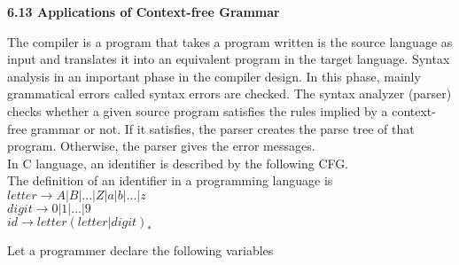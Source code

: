\documentclass[a4,9pt]{beamer}
\begin{document}
\begin{frame}
\large{
\textbf{6.13 Applications of Context-free Grammar}\\
}

\vspace*{0.2cm}
\small{
The compiler is a program that takes a program written is the source language as input and translates it
into an equivalent program in the target language. Syntax analysis in an important phase in the compiler
design. In this phase, mainly grammatical errors called syntax errors are checked. The syntax analyzer
(parser) checks whether a given source program satisfies the rules implied by a context-free grammar
or not. If it satisfies, the parser creates the parse tree of that program. Otherwise, the parser gives the
error messages.\\
\hspace*{0.5cm} In C language, an identifier is described by the following CFG.\\
\hspace*{0.5cm} The definition of an identifier in a programming language is\\

\vspace*{0.2cm}
\hspace*{4cm} $letter \rightarrow A | B | . . . | Z | a | b | ... | z$ \\
\hspace*{4cm} $digit \rightarrow 0 | 1 | . . . | 9$ \\
\hspace*{4.5cm} $id \rightarrow letter (letter | digit)_{*}$ \\
\vspace*{0.2cm}

Let a programmer declare the following variables
}
\vspace*{0.2cm}

\end{frame}
\end{document}
